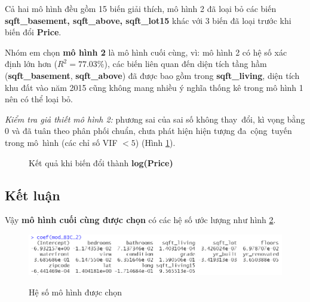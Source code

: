 Cả hai mô hình đều gồm 15 biến giải thích, mô hình 2 đã loại bỏ các biến \textbf{sqft\_basement, sqft\_above, sqft\_lot15} khác với 3 biến đã loại trước khi biến đổi \textbf{Price}. 

Nhóm em chọn \textbf{mô hình 2} là mô hình cuối cùng, vì: mô hình 2 có hệ số xác định lớn hơn ($R^2=77.03\%$), các biến liên quan đến diện tích tầng hầm (\textbf{sqft\_basement}, \textbf{sqft\_above}) đã được bao gồm trong \textbf{sqft\_living}, diện tích khu đất vào năm 2015 cũng không mang nhiều ý nghĩa thống kê trong mô hình 1 nên có thể loại bỏ.

\textit{Kiểm tra giả thiết mô hình 2:} phương sai của sai số không thay~đổi, kì vọng bằng 0 và đã tuân theo phân phối chuẩn, chưa phát hiện hiện tượng đa~cộng~tuyến trong mô~hình (các chỉ số VIF $< 5$) (Hình \ref{B2_final}). 

 \begin{figure}[H]
	\centering
	\hfill
	\caption{Kết quả khi biến đổi thành \textbf{log(Price)}}
	\label{B2_final}
\end{figure}
\subsection*{Kết luận}
Vậy \textbf{mô hình cuối cùng được chọn} có các hệ số ước lượng như hình \ref{B2_coef}.
\begin{figure}[H]
	\centering
	{\includegraphics[width=\linewidth]{../Photo Of Result/B2_coef}}
	\caption{Hệ số mô hình được chọn}
	\label{B2_coef}
\end{figure}

